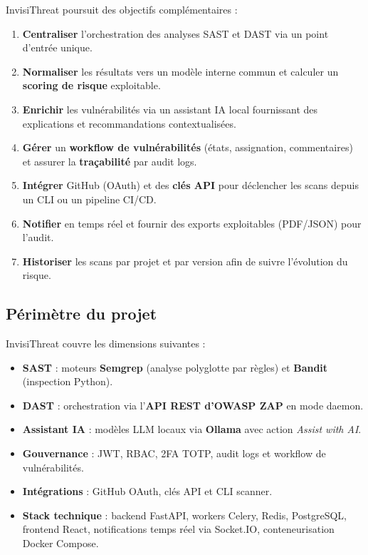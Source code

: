 InvisiThreat poursuit des objectifs complémentaires :

\begin{enumerate}
  \item \textbf{Centraliser} l'orchestration des analyses SAST et DAST via un point d'entrée unique.
  \item \textbf{Normaliser} les résultats vers un modèle interne commun et calculer un \textbf{scoring de risque} exploitable.
  \item \textbf{Enrichir} les vulnérabilités via un assistant IA local fournissant des explications et recommandations contextualisées.
  \item \textbf{Gérer} un \textbf{workflow de vulnérabilités} (états, assignation, commentaires) et assurer la \textbf{traçabilité} par audit logs.
  \item \textbf{Intégrer} GitHub (OAuth) et des \textbf{clés API} pour déclencher les scans depuis un CLI ou un pipeline CI/CD.
  \item \textbf{Notifier} en temps réel et fournir des exports exploitables (PDF/JSON) pour l'audit.
  \item \textbf{Historiser} les scans par projet et par version afin de suivre l'évolution du risque.
\end{enumerate}

\subsection{Périmètre du projet}

InvisiThreat couvre les dimensions suivantes :

\begin{itemize}
  \item \textbf{SAST} : moteurs \textbf{Semgrep} (analyse polyglotte par règles) et \textbf{Bandit} (inspection Python).
  \item \textbf{DAST} : orchestration via l'\textbf{API REST d'OWASP ZAP} en mode daemon.
  \item \textbf{Assistant IA} : modèles LLM locaux via \textbf{Ollama} avec action \textit{Assist with AI}.
  \item \textbf{Gouvernance} : JWT, RBAC, 2FA TOTP, audit logs et workflow de vulnérabilités.
  \item \textbf{Intégrations} : GitHub OAuth, clés API et CLI scanner.
  \item \textbf{Stack technique} : backend FastAPI, workers Celery, Redis, PostgreSQL, frontend React, notifications temps réel via Socket.IO, conteneurisation Docker Compose.
\end{itemize}

